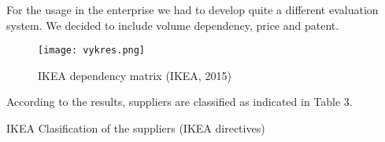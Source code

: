 \documentclass[oneside,12pt]{article}%
\begin{document}
For the usage in the enterprise we had to develop quite a different evaluation system. We decided to include volume dependency, price and patent.


\begin{figure}[ht!]
  \texttt{[image: vykres.png]}
  \caption{IKEA dependency matrix (IKEA, 2015)}
\end{figure}


According to the results, suppliers are classified as indicated in Table 3.


\begin{table}[h]
  \centering
  \caption{IKEA Clasification of the suppliers (IKEA directives)}
  \vspace{10mm}
  \scalebox{0.7}{

}
\end{table}
\end{document}
